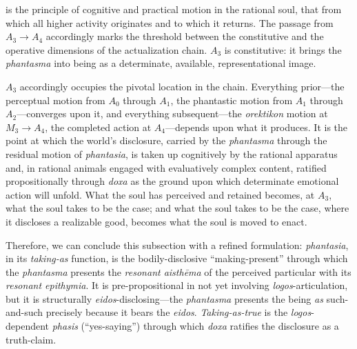 \documentclass{article}
\begin{document}
is the principle of cognitive and practical motion in the rational soul, that from which all higher activity originates and to which it returns. The passage from $A_3 \to A_4$ accordingly marks the threshold between the constitutive and the operative dimensions of the actualization chain. $A_3$ is constitutive: it brings the \textit{phantasma} into being as a determinate, available, representational image. 

$A_3$ accordingly occupies the pivotal location in the chain. Everything prior---the perceptual motion from $A_0$ through $A_1$, the phantastic motion from $A_1$ through $A_2$---converges upon it, and everything subsequent---the \textit{orektikon} motion at $M_3 \rightarrow A_4$, the completed action at $A_4$---depends upon what it produces. It is the point at which the world's disclosure, carried by the \textit{phantasma} through the residual motion of \textit{phantasia}, is taken up cognitively by the rational apparatus and, in rational animals engaged with evaluatively complex content, ratified propositionally through \textit{doxa} as the ground upon which determinate emotional action will unfold. What the soul has perceived and retained becomes, at $A_3$, what the soul takes to be the case; and what the soul takes to be the case, where it discloses a realizable good, becomes what the soul is moved to enact.

Therefore, we can conclude this subsection with a refined formulation: \textit{phantasia}, in its \textit{taking-as} function, is the bodily-disclosive ``making-present'' through which the \textit{phantasma} presents the \textit{resonant aisthēma} of the perceived particular with its \textit{resonant epithymia}. It is pre-propositional in not yet involving \textit{logos}-articulation, but it is structurally \textit{eidos}-disclosing---the \textit{phantasma} presents the being \textit{as} such-and-such precisely because it bears the \textit{eidos}. \textit{Taking-as-true} is the \textit{logos}-dependent \textit{phasis} (``yes-saying'') through which \textit{doxa} ratifies the disclosure as a truth-claim. 
\end{document}
